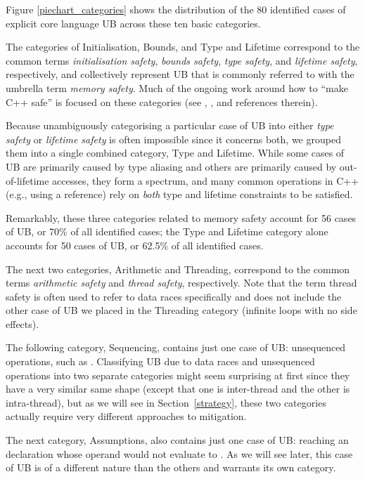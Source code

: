 Figure \ref{piechart_categories} shows the distribution of the 80 identified cases of explicit core language UB across these ten basic categories. 

The categories of Initialisation, Bounds, and Type and Lifetime correspond to the common terms \emph{initialisation safety}, \emph{bounds safety}, \emph{type safety},  and \emph{lifetime safety}, respectively, and collectively represent UB that is commonly referred to with the umbrella term \emph{memory safety}. Much of the ongoing work around how to ``make C++ safe'' is focused on these  categories (see \cite{P3081R2}, \cite{P3700R0}, and references therein).

Because unambiguously categorising a particular case of UB into either \emph{type safety} or \emph{lifetime safety} is often impossible since it concerns both, we grouped them into a single combined category, Type and Lifetime. While some cases of UB are primarily caused by type aliasing and others are primarily caused by out-of-lifetime accesses, they form a spectrum, and many common operations in C++ (e.g., using a reference) rely on \emph{both} type and lifetime constraints to be satisfied.

Remarkably, these three categories related to memory safety account for 56 cases of UB, or 70\% of all identified cases; the Type and Lifetime category alone accounts for 50 cases of UB, or 62.5\% of all identified cases.

The next two categories, Arithmetic and Threading, correspond to the common terms \emph{arithmetic safety} and \emph{thread safety}, respectively. Note that  the term thread safety is often used to refer to data races specifically and does not include the other case of UB we placed in the Threading category (infinite loops with no side effects).

The following category, Sequencing, contains just one case of UB: unsequenced operations, such as \mbox{}. Classifying UB due to data races and unsequenced operations into two separate categories might seem surprising at first since they have a very similar same shape (except that one is inter-thread and the other is intra-thread), but as we will see in Section~\ref{strategy}, these two categories actually require very different approaches to mitigation.

The next category, Assumptions, also contains just one case of UB: reaching an \tcode{[[assume]]} declaration whose operand would not evaluate to . As we will see later, this case of UB is of a different nature than the others and warrants its own category.

